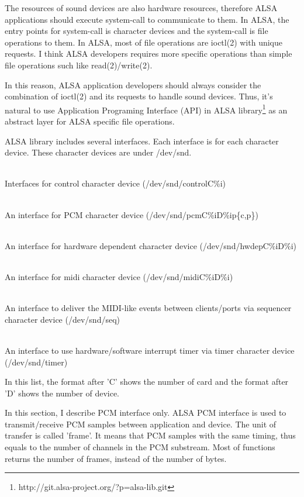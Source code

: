 \documentclass[onecolumn]{article}
\begin{document}
The resources of sound devices are also hardware resources, therefore ALSA applications should execute system-call to communicate to them. In ALSA, the entry points for system-call is character devices and the system-call is file operations to them. In ALSA, most of file operations are ioctl(2) with unique requests. I think ALSA developers requires more specific operations than simple file operations such like read(2)/write(2).

In this reason, ALSA application developers should always consider the combination of ioctl(2) and its requests to handle sound devices. Thus, it's natural to use Application Programing Interface (API) in ALSA library\footnote{http://git.alsa-project.org/?p=alsa-lib.git} as an abstract layer for ALSA specific file operations.

ALSA library includes several interfaces. Each interface is for each character device. These character devices are under /dev/snd.

\begin{description}
\small
\item[Mixer/hcontrol/control interface] \mbox{} \\
Interfaces for control character device (/dev/snd/controlC\%i)
\item[PCM interface] \mbox{} \\
An interface for PCM character device (/dev/snd/pcmC\%iD\%ip\{c,p\})
\item[hwdep interface] \mbox{} \\
An interface for hardware dependent character device (/dev/snd/hwdepC\%iD\%i)
\item[RawMidi interface] \mbox{} \\
An interface for midi character device (/dev/snd/midiC\%iD\%i)
\item[Sequencer interface] \mbox{} \\
An interface to deliver the MIDI-like events between clients/ports via sequencer character device (/dev/snd/seq)
\item[Timer interface] \mbox{} \\
An interface to use hardware/software interrupt timer via timer character device (/dev/snd/timer)
\end{description}

In this list, the format after 'C' shows the number of card and the format after 'D' shows the number of device.

In this section, I describe PCM interface only. ALSA PCM interface is used to transmit/receive PCM samples between application and device. The unit of transfer is called 'frame'. It means that PCM samples with the same timing, thus equals to the number of channels in the PCM substream. Most of functions returns the number of frames, instead of the number of bytes.
\end{document}
